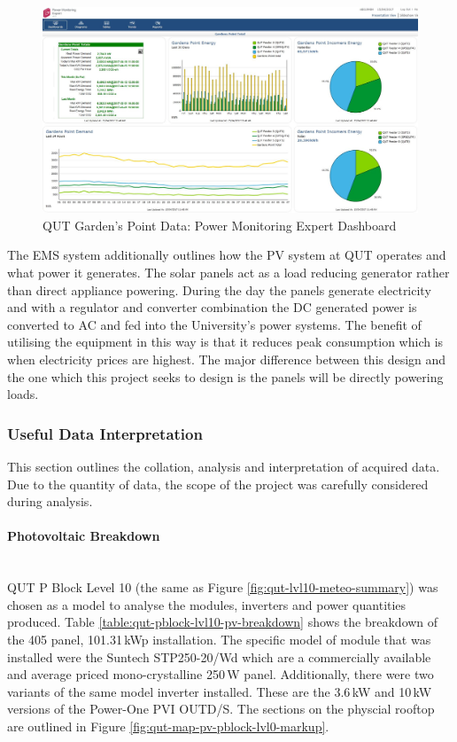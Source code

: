 \begin{figure}[H]
	\hfill\includegraphics[width = 150mm]{images/metering/pme/summary-dashboard}\hspace*{\fill}
	\caption{QUT Garden's Point Data: Power Monitoring Expert Dashboard} 
	\label{fig:qut-summary-dashboard}
\end{figure}

The EMS system additionally outlines how the PV system at QUT operates and what power it generates. The solar panels act as a load reducing generator rather than direct appliance powering. During the day the panels generate electricity and with a regulator and converter combination the DC generated power is converted to AC and fed into the University's power systems. The benefit of utilising the equipment in this way is that it reduces peak consumption which is when electricity prices are highest. The major difference between this design and the one which this project seeks to design is the panels will be directly powering loads.

\newpage

\subsubsection{Useful Data Interpretation}

This section outlines the collation, analysis and interpretation of acquired data. Due to the quantity of data, the scope of the project was carefully considered during analysis. 

\paragraph{Photovoltaic Breakdown}
~\\
QUT P Block Level 10 (the same as Figure \ref{fig:qut-lvl10-meteo-summary}) was chosen as a model to analyse the modules, inverters and power quantities produced. Table \ref{table:qut-pblock-lvl10-pv-breakdown} shows the breakdown of the 405 panel, 101.31\,kWp installation. The specific model of module that was installed were the Suntech STP250-20/Wd which are a commercially available and average priced mono-crystalline 250\,W panel. Additionally, there were two variants of the same model inverter installed. These are the 3.6\,kW and 10\,kW versions of the Power-One PVI OUTD/S. The sections on the physcial rooftop are outlined in Figure \ref{fig:qut-map-pv-pblock-lvl0-markup}.        


